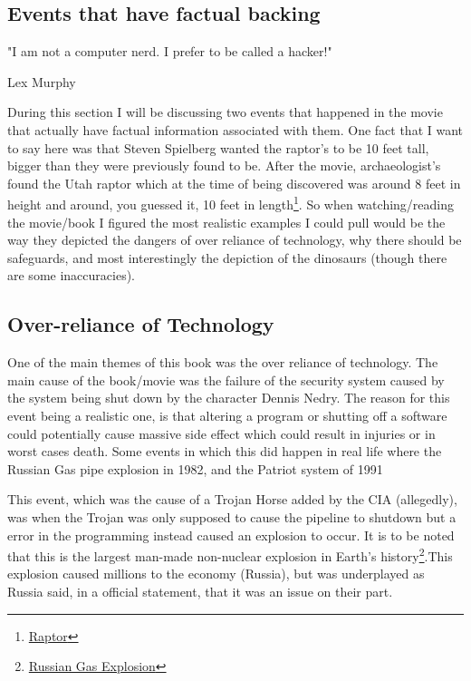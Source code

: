 \documentclass[12ptletterpaper]{paper}
\newcommand\tab[1][1cm]{\hspace*{#1}}
\begin{document}
\begin{flushleft}
		\section{Events that have factual backing}
		\epigraph{"I am not a computer nerd. I prefer to be called a hacker!"}{Lex Murphy}
		
		
		\tab During this section I will be discussing two events that happened in the movie that actually have factual information associated with them. One fact that I want to say here was that Steven Spielberg wanted the raptor's to be 10 feet tall, bigger than they were previously found to be. After the movie, archaeologist's found the Utah raptor which at the time of being discovered was around 8 feet in height and around, you guessed it, 10 feet in length\footnote[6]{\hyperlink{Raptor}{Raptor}}. So when watching/reading the movie/book I figured the most realistic examples I could pull would be the way they depicted the dangers of over reliance of technology, why there should be safeguards, and most interestingly the depiction of the dinosaurs (though there are some inaccuracies).
		
		\subsection{Over-reliance of Technology}
		\tab One of the main themes of this book was the over reliance of technology. The main cause of the book/movie was the failure of the security system caused by the system being shut down by the character Dennis Nedry. The reason for this event being a realistic one, is that altering a program or shutting off a software could potentially cause massive side effect which could result in injuries or in worst cases death. Some events in which this did happen in real life where the Russian Gas pipe explosion in 1982, and the Patriot system of 1991
		
		
		\tab This event, which was the cause of a Trojan Horse added by the CIA (allegedly), was when the Trojan was only supposed to cause the pipeline to shutdown but a error in the programming instead caused an explosion to occur. It is to be noted that this is the largest man-made non-nuclear explosion in Earth's history\footnote[7]{\hyperlink{Russian Gas Explosion}{Russian Gas Explosion}}.This explosion caused millions to the economy (Russia), but was underplayed as Russia said, in a official statement, that it was an issue on their part.
		

\end{flushleft}
\end{document}
